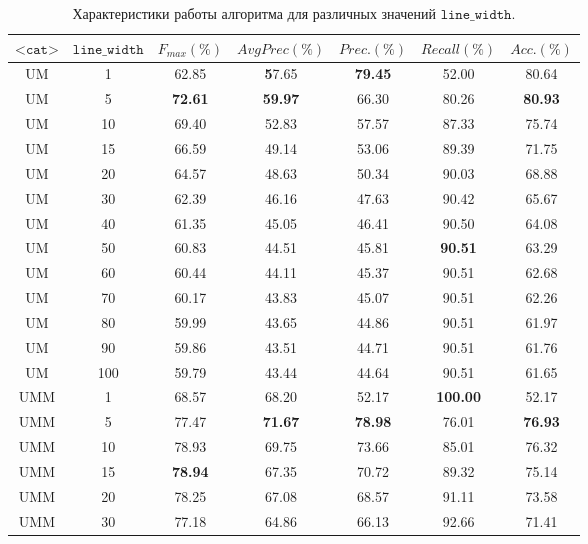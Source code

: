 \documentclass[oneside,final,12pt]{scrartcl}
\begin{document}
	\begin{table}[p]
		\centering
		\caption{Характеристики работы алгоритма для различных значений \(\texttt{line\_width}\).}
		\label{tb:l_width}
		\begin{tabular}{|c|c|c|c|c|c|c|}
			\hline
			\(\texttt{<cat>}\) & \(\texttt{line\_width}\) & \(F_{max} (\%)\) & \(AvgPrec (\%)\) & \(Prec. (\%)\) & \(Recall (\%)\) & \(Acc. (\%)\) \\
			\hline
			\hline
			\hline
			UM & 1 & 62.85 & \textbf57.65 & \textbf{79.45} & 52.00 & 80.64 \\
			\hline
			UM & 5 & \textbf{72.61} & \textbf{59.97} & 66.30 & 80.26 & \textbf{80.93} \\
			\hline
			UM & 10 & 69.40 & 52.83 & 57.57 & 87.33 & 75.74 \\
			\hline
			UM & 15 & 66.59 & 49.14 & 53.06 & 89.39 & 71.75 \\
			\hline
			UM & 20 & 64.57 & 48.63 & 50.34 & 90.03 & 68.88 \\
			\hline
			UM & 30 & 62.39 & 46.16 & 47.63 & 90.42 & 65.67 \\
			\hline
			UM & 40 & 61.35 & 45.05 & 46.41 & 90.50 & 64.08 \\
			\hline
			UM & 50 & 60.83 & 44.51 & 45.81 & \textbf{90.51} & 63.29  \\
			\hline
			UM & 60 & 60.44 & 44.11 & 45.37 & 90.51 & 62.68 \\
			\hline
			UM & 70 & 60.17 & 43.83 & 45.07 & 90.51 & 62.26 \\
			\hline
			UM & 80 & 59.99 & 43.65 & 44.86 & 90.51 & 61.97 \\
			\hline
			UM & 90 & 59.86 & 43.51 & 44.71 & 90.51 & 61.76 \\
			\hline
			UM & 100 & 59.79 & 43.44 & 44.64 & 90.51 & 61.65 \\
			\hline
			\hline
			\hline
			UMM & 1 & 68.57 & 68.20 & 52.17 & \textbf{100.00} & 52.17 \\
			\hline
			UMM & 5 & 77.47 & \textbf{71.67} & \textbf{78.98} & 76.01 & \textbf{76.93} \\
			\hline
			UMM & 10 & 78.93 & 69.75 & 73.66 & 85.01 & 76.32 \\
			\hline
			UMM & 15 & \textbf{78.94} & 67.35 & 70.72 & 89.32 & 75.14 \\
			\hline
			UMM & 20 & 78.25 & 67.08 & 68.57 & 91.11 & 73.58 \\
			\hline
			UMM & 30 & 77.18 & 64.86 & 66.13 & 92.66 & 71.41 \\

\end{tabular}
\end{table}
\end{document}
